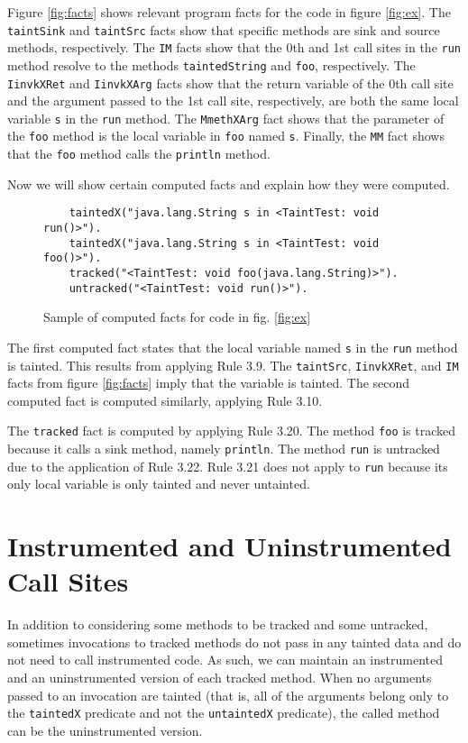 Figure \ref{fig:facts} shows relevant program facts for the code in
figure \ref{fig:ex}. The \texttt{taintSink} and \texttt{taintSrc}
facts show that specific methods are sink and source methods,
respectively. The \texttt{IM} facts show that the 0th and 1st call
sites in the \texttt{run} method resolve to the methods
\texttt{taintedString} and \texttt{foo}, respectively. The
\texttt{IinvkXRet} and \texttt{IinvkXArg} facts show that the return
variable of the 0th call site and the argument passed to the 1st call
site, respectively, are both the same local variable \texttt{s} in the
\texttt{run} method. The \texttt{MmethXArg} fact shows that the
parameter of the \texttt{foo} method is the local variable in
\texttt{foo} named \texttt{s}. Finally, the \texttt{MM} fact shows
that the \texttt{foo} method calls the \texttt{println} method.

Now we will show certain computed facts and explain how they were
computed.

\begin{figure}[H]
  \begin{lstlisting}
    taintedX("java.lang.String s in <TaintTest: void run()>").
    taintedX("java.lang.String s in <TaintTest: void foo()>").
    tracked("<TaintTest: void foo(java.lang.String)>").
    untracked("<TaintTest: void run()>").
  \end{lstlisting}
  \caption{Sample of computed facts for code in fig. \ref{fig:ex}}\label{fig:sol}
\end{figure}

The first computed fact states that the local variable named \texttt{s} in the \texttt{run} method is tainted. This results from applying Rule 3.9. The \texttt{taintSrc}, \texttt{IinvkXRet}, and \texttt{IM} facts from figure \ref{fig:facts} imply that the variable is tainted. The second computed fact is computed similarly, applying Rule 3.10.

The \texttt{tracked} fact is computed by applying Rule 3.20. The method \texttt{foo} is tracked because it calls a sink method, namely \texttt{println}. The method \texttt{run} is untracked due to the application of Rule 3.22. Rule 3.21 does not apply to \texttt{run} because its only local variable is only tainted and never untainted. 
    
\section{Instrumented and Uninstrumented Call Sites}
In addition to considering some methods to be tracked and some
untracked, sometimes invocations to tracked methods do not pass in any
tainted data and do not need to call instrumented code. As such, we
can maintain an instrumented and an uninstrumented version of each
tracked method. When no arguments passed to an invocation are tainted
(that is, all of the arguments belong only to the \texttt{taintedX}
predicate and not the \texttt{untaintedX} predicate), the called
method can be the uninstrumented version.

